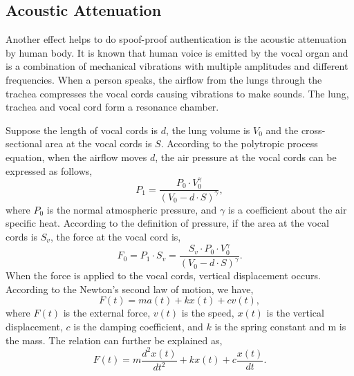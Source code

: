 
\subsection{Acoustic Attenuation}
Another effect helps {\shortname} to do spoof-proof authentication is the acoustic attenuation by human body.
%
It is known that human voice is emitted by the vocal organ and is a combination of mechanical vibrations with multiple  amplitudes and different  frequencies.
%
When a person speaks, the  airflow from the lungs through the trachea compresses the vocal cords causing vibrations to make sounds. The lung, trachea and vocal cord form a resonance chamber. 

Suppose the length of vocal cords is $d$, the lung volume is $V_0$ and the cross-sectional area at the vocal cords is $S$. According to the polytropic process equation, when the airflow moves $d$, the air pressure at the vocal cords can be expressed as follows,
\begin{displaymath}
P_1 = \frac{P_0 \cdot V^\gamma_0 }{(V_0 - d \cdot S)^\gamma},
\end{displaymath}
where $P_0$ is the normal atmospheric pressure, and $\gamma$ is a coefficient about the air specific heat. 
According to the definition of pressure, if the area at the vocal cords is $S_v$,  the force at the vocal cord is,
\begin{displaymath}
F_0 = P_1 \cdot S_v = \frac{S_v \cdot P_0 \cdot V^\gamma_0 }{(V_0 - d \cdot S)^\gamma}.
\end{displaymath}
When the force is applied to the vocal cords, vertical displacement occurs. 
According to the Newton’s second law of motion, we have,
\begin{displaymath}
F(t) = m a(t) + k x(t) + c v(t),
\end{displaymath}
where $F(t)$ is the external force, $v(t)$ is the speed, $x(t)$ is the vertical displacement, $c$ is the damping coefficient, and $k$ is the spring constant and m is the mass. 
The relation can further be explained as,
\begin{equation}
F(t) = m \frac{d^2 x(t)}{d t^2} + k x(t) + c \frac{x(t)}{d t}.
\label{eq:force}
\end{equation}

